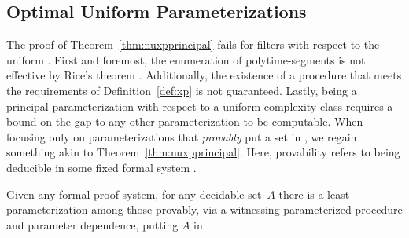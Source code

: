 \subsection{Optimal Uniform Parameterizations}
\label{sec:optimal_uniform_parameterizations}%
The proof of Theorem~\ref{thm:nuxpprincipal} fails for filters with respect to the uniform .
First and foremost, the enumeration of polytime-segments is not effective by Rice's theorem \parencite{rice1953classes}.
Additionally, the existence of a procedure that meets the requirements of Definition~\ref{def:xp} is not guaranteed.
Lastly, being a principal parameterization with respect to a uniform complexity class requires a bound on the gap to any other parameterization to be computable.
When focusing only on parameterizations that \emph{provably} put a set in , we regain something akin to Theorem~\ref{thm:nuxpprincipal}.
Here, provability refers to being deducible in some fixed formal system \parencite{kleene1967mathematical}.
\begin{theorem}
\label{thm:xpprincipal}%
  Given any formal proof system, for any decidable set~$A$ there is a least parameterization among those provably, via a witnessing parameterized procedure and parameter dependence, putting $A$ in .
\end{theorem}
